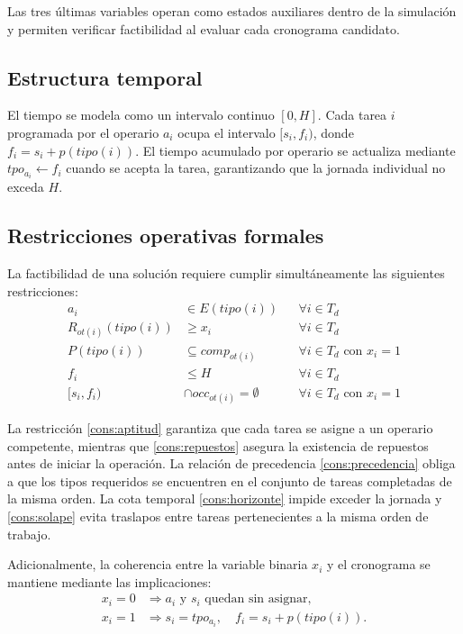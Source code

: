 Las tres últimas variables operan como estados auxiliares dentro de la simulación y permiten verificar factibilidad
al evaluar cada cronograma candidato.

\subsection{Estructura temporal}

El tiempo se modela como un intervalo continuo \([0, H]\). Cada tarea \(i\) programada por el operario \(a_i\) ocupa el
intervalo \([s_i, f_i)\), donde \(f_i = s_i + p(tipo(i))\). El tiempo acumulado por operario se actualiza mediante
\(tpo_{a_i} \gets f_i\) cuando se acepta la tarea, garantizando que la jornada individual no exceda \(H\).

\subsection{Restricciones operativas formales}

La factibilidad de una solución requiere cumplir simultáneamente las siguientes restricciones:
\begin{align}
a_i &\in E(tipo(i)) && \forall i \in T_d \label{cons:aptitud} \\
R_{ot(i)}(tipo(i)) &\geq x_i && \forall i \in T_d \label{cons:repuestos} \\
P(tipo(i)) &\subseteq comp_{ot(i)} && \forall i \in T_d \text{ con } x_i = 1 \label{cons:precedencia} \\
f_i &\leq H && \forall i \in T_d \label{cons:horizonte} \\
[s_i, f_i) &\cap occ_{ot(i)} = \emptyset && \forall i \in T_d \text{ con } x_i = 1 \label{cons:solape}
\end{align}

La restricción \eqref{cons:aptitud} garantiza que cada tarea se asigne a un operario competente, mientras que
\eqref{cons:repuestos} asegura la existencia de repuestos antes de iniciar la operación. La relación de precedencia
\eqref{cons:precedencia} obliga a que los tipos requeridos se encuentren en el conjunto de tareas completadas de la
misma orden. La cota temporal \eqref{cons:horizonte} impide exceder la jornada y \eqref{cons:solape} evita traslapos entre
tareas pertenecientes a la misma orden de trabajo.

Adicionalmente, la coherencia entre la variable binaria \(x_i\) y el cronograma se mantiene mediante las implicaciones:
\[
\begin{aligned}
x_i = 0 &\Rightarrow a_i \text{ y } s_i \text{ quedan sin asignar},\\
x_i = 1 &\Rightarrow s_i = tpo_{a_i}, \quad f_i = s_i + p(tipo(i)).
\end{aligned}
\]

